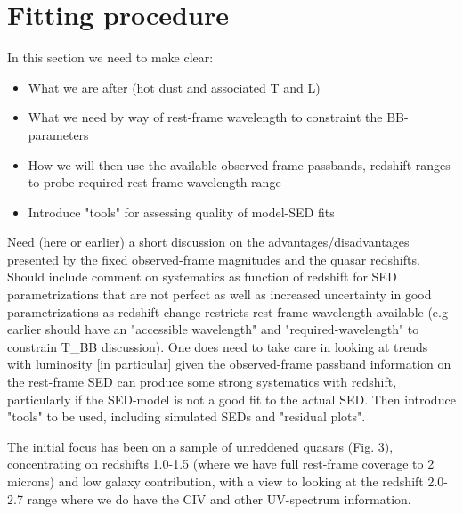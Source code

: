 \section{Fitting procedure}

In this section we need to make clear:
\begin{itemize}
    \item What we are after (hot dust and associated T and L)
    \item What we need by way of rest-frame wavelength to constraint the BB-parameters
    \item How we will then use the available observed-frame passbands, redshift ranges to probe required rest-frame wavelength range
    \item Introduce "tools" for assessing quality of model-SED fits
\end{itemize}

Need (here or earlier) a short discussion on the advantages/disadvantages presented by the fixed observed-frame magnitudes and the quasar redshifts. 
Should include comment on systematics as function of redshift for SED parametrizations that are not perfect as well as increased uncertainty in good parametrizations as redshift change restricts rest-frame wavelength available (e.g earlier should have an "accessible wavelength" and "required-wavelength" to constrain T\_BB discussion). 
One does need to take care in looking at trends with luminosity [in particular] given the observed-frame passband information on the rest-frame SED can produce some strong systematics with redshift, particularly if the SED-model is not a good fit to the actual SED. 
Then introduce "tools" to be used, including simulated SEDs and "residual plots".
 
The initial focus has been on a sample of unreddened quasars (Fig. 3), concentrating on redshifts 1.0-1.5 (where we have full rest-frame coverage to 2 microns) and low galaxy contribution, with a view to looking at the redshift 2.0-2.7 range where we do have the CIV and other UV-spectrum information.

